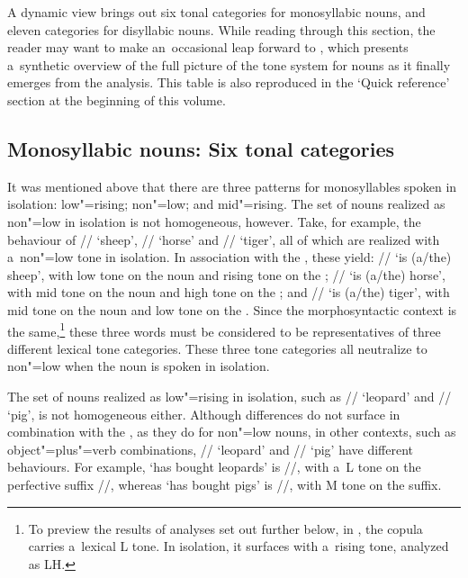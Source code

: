 A dynamic view brings out six tonal categories for monosyllabic nouns, and eleven categories for disyllabic nouns. While reading through this section, the reader may want to make an~occasional
leap forward to , which presents a~synthetic overview of the full picture of the tone system for nouns as it finally emerges from the analysis. This table is also reproduced in the ‘Quick reference’ section at the beginning of this volume.

\subsection{Monosyllabic nouns: Six tonal categories}
\label{sec:monosyllabicnouns}

It was mentioned above that there are three patterns for monosyllables spoken in isolation:
low"=rising; non"=low; and mid"=rising. The set of nouns realized as non"=low in isolation is not
homogeneous, however. Take, for example, the behaviour of // ‘sheep’, // ‘horse’ and // ‘tiger’, all of
which are realized with a~non"=low tone in isolation. In association with the , these yield:
// ‘is \mbox{(a/the)} sheep’, with low tone on the noun and rising tone on the ; // ‘is
(a/the) horse’, with mid tone on the noun and high tone on the ; and // ‘is \mbox{(a/the)}
tiger’, with mid tone on the noun and low tone on the . Since the morphosyntactic context is
the same,\footnote{To preview the results of analyses set out further below, in , the {copula} carries a~lexical L tone. In isolation, it surfaces with a~rising tone, analyzed as LH.} these three words must be considered to be representatives of three different lexical
tone categories. These three tone categories all neutralize to non"=low when the noun is spoken in isolation.

The set of nouns realized as low"=rising in isolation, such as // ‘leopard’ and // ‘pig’, is not homogeneous either. Although differences do not surface in combination with the , as they do for non"=low nouns, in other contexts, 
such as object"=plus"=verb combinations, // ‘leopard’ and // ‘pig’ have different behaviours. For
example, ‘has bought leopards’ is //, with a~L tone on the {perfective} suffix //,
whereas ‘has bought pigs’ is //, with M tone on the suffix.

